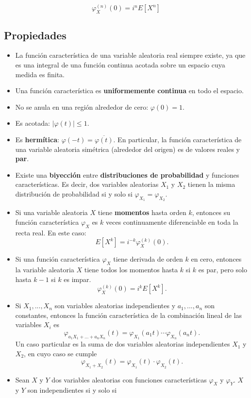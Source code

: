 \[
    \varphi_X^{(n)}(0) = i^n E[X^n]
\]

\subsection*{Propiedades}

\begin{itemize}
    \item La función característica de una variable aleatoria real siempre existe, ya que es una integral de una función continua acotada sobre un espacio cuya medida es finita.
    \item Una función característica es \textbf{uniformemente continua} en todo el espacio.
    \item No se anula en una región alrededor de cero: $\varphi(0) = 1$.
    \item Es acotada: $|\varphi(t)| \leq 1$.
    \item Es \textbf{hermítica}: $\varphi(-t) = \overline{\varphi(t)}$. En particular, la función característica de una variable aleatoria simétrica (alrededor del origen) es de valores reales y \textbf{par}.
    \item Existe una \textbf{biyección} entre \textbf{distribuciones de probabilidad} y funciones características. Es decir, dos variables aleatorias $X_1$ y $X_2$ tienen la misma distribución de probabilidad si y solo si $\varphi_{X_1} = \varphi_{X_2}$.
    \item Si una variable aleatoria $X$ tiene \textbf{momentos} hasta orden $k$, entonces su función característica $\varphi_X$ es $k$ veces continuamente diferenciable en toda la recta real. En este caso:
    \[
    E[X^k] = i^{-k} \varphi_X^{(k)}(0).
    \]
    \item Si una función característica $\varphi_X$ tiene derivada de orden $k$ en cero, entonces la variable aleatoria $X$ tiene todos los momentos hasta $k$ si $k$ es par, pero solo hasta $k-1$ si $k$ es impar.
    \[
    \varphi_X^{(k)}(0) = i^k E[X^k].
    \]
    \item Si $X_1, ..., X_n$ son variables aleatorias independientes y $a_1, ..., a_n$ son constantes, entonces la función característica de la combinación lineal de las variables $X_i$ es
    \[
    \varphi_{a_1 X_1 + \dots + a_n X_n}(t) = \varphi_{X_1}(a_1 t) \cdots \varphi_{X_n}(a_n t).
    \]
    Un caso particular es la suma de dos variables aleatorias independientes $X_1$ y $X_2$, en cuyo caso se cumple
    \[
    \varphi_{X_1 + X_2}(t) = \varphi_{X_1}(t) \cdot \varphi_{X_2}(t).
    \]
    \item Sean $X$ y $Y$ dos variables aleatorias con funciones características $\varphi_X$ y $\varphi_Y$. $X$ y $Y$ son independientes si y solo si

\end{itemize}
